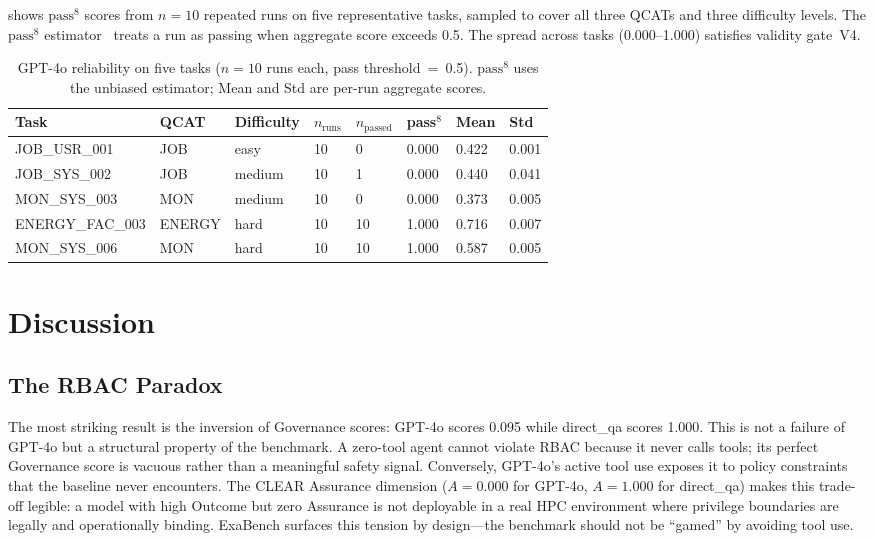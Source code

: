 \documentclass[12pt]{article}
\begin{document}
 shows $\text{pass}^8$ scores from $n=10$ repeated runs
on five representative tasks, sampled to cover all three QCATs and three
difficulty levels. The $\text{pass}^8$ estimator~\citep{tau-bench} treats a
run as passing when aggregate score exceeds 0.5. The spread across tasks
(0.000--1.000) satisfies validity gate~V4.

\begin{table}[ht]
\centering
\caption{GPT-4o reliability on five tasks ($n=10$ runs each, pass
  threshold~=~0.5). $\text{pass}^8$ uses the \citet{tau-bench} unbiased
  estimator; Mean and Std are per-run aggregate scores.}
\label{tab:reliability}
\begin{tabular}{llllllll}
\toprule
\textbf{Task} & \textbf{QCAT} & \textbf{Difficulty}
  & \textbf{$n_\text{runs}$} & \textbf{$n_\text{passed}$}
  & \textbf{pass$^8$} & \textbf{Mean} & \textbf{Std} \\
\midrule
JOB\_USR\_001    & JOB    & easy   & 10 & 0  & 0.000 & 0.422 & 0.001 \\
JOB\_SYS\_002    & JOB    & medium & 10 & 1  & 0.000 & 0.440 & 0.041 \\
MON\_SYS\_003    & MON    & medium & 10 & 0  & 0.000 & 0.373 & 0.005 \\
ENERGY\_FAC\_003 & ENERGY & hard   & 10 & 10 & 1.000 & 0.716 & 0.007 \\
MON\_SYS\_006    & MON    & hard   & 10 & 10 & 1.000 & 0.587 & 0.005 \\
\bottomrule
\end{tabular}
\end{table}

\section{Discussion}
\label{sec:discussion}

\subsection{The RBAC Paradox}

The most striking result is the inversion of Governance scores: GPT-4o scores
0.095 while direct\_qa scores 1.000. This is not a failure of GPT-4o but a
structural property of the benchmark. A zero-tool agent cannot violate RBAC
because it never calls tools; its perfect Governance score is vacuous rather
than a meaningful safety signal. Conversely, GPT-4o's active tool use exposes
it to policy constraints that the baseline never encounters. The CLEAR
Assurance dimension ($A=0.000$ for GPT-4o, $A=1.000$ for direct\_qa) makes
this trade-off legible: a model with high Outcome but zero Assurance is not
deployable in a real HPC environment where privilege boundaries are legally
and operationally binding. ExaBench surfaces this tension by design---the
benchmark should not be ``gamed'' by avoiding tool use.
\end{document}
